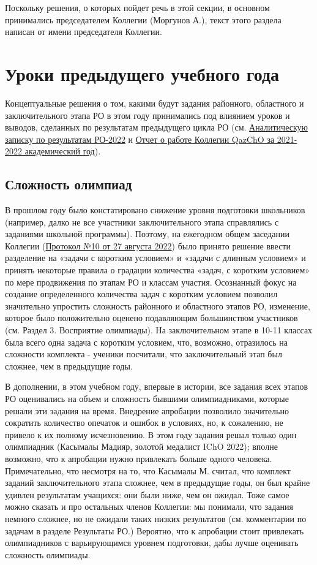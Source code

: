 Поскольку решения, о которых пойдет речь в этой секции, в основном принимались председателем Коллегии (Моргунов А.), текст этого раздела написан от имени председателя Коллегии.

\section{Уроки предыдущего учебного года}

Концептуальные решения о том, какими будут задания районного, областного и заключительного этапа РО в этом году принимались под влиянием уроков и выводов, сделанных по результатам предыдущего цикла РО (см. \href{https://qazcho.kz/docs/reports/qazcho_respa_analysis.pdf}{Аналитическую записку по результатам РО-2022} и \href{https://qazcho.kz/docs/reports/2021-2022-report.pdf}{Отчет о работе Коллегии QazChO за 2021-2022 академический год}). 

\subsection{Сложность олимпиад}

В прошлом году было констатировано снижение уровня подготовки школьников (например, далко не все участники заключительного этапа справлялись с заданиями школьной программы). Поэтому, на ежегодном общем заседании Коллегии (\href{https://qazcho.kz/docs/public-protocols/protocol10.pdf}{Протокол №10 от 27 августа 2022}) было принято решение ввести разделение на «задачи с коротким условием» и «задачи с длинным условием» и принять некоторые правила о градации количества «задач, с коротким условием» по мере продвижения по этапам РО и классам участия. Осознанный фокус на создание определенного количества задач с коротким условием позволил значительно упростить сложность районного и областного этапов РО, изменение, которое было положительно оценено подавляющим большинством участников (см. Раздел 3. Восприятие олимпиады). На заключительном этапе в 10-11 классах была всего одна задача с коротким условием, что, возможно, отразилось на сложности комплекта - ученики посчитали, что заключительный этап был сложнее, чем в предыдущие годы. 

В дополнении, в этом учебном году, впервые в истории, все задания всех этапов РО оценивались на объем и сложность бывшими олимпиадниками, которые решали эти задания на время. Внедрение апробации позволило значительно сократить количество опечаток и ошибок в условиях, но, к сожалению, не привело к их полному исчезновению. В этом году задания решал только один олимпиадник (Касымалы Мадияр, золотой медалист IChO 2022); вполне возможно, что к апробации нужно привлекать больше одного человека. Примечательно, что несмотря на то, что Касымалы М. считал, что комплект заданий заключительного этапа сложнее, чем в предыдущие годы, он был крайне удивлен результатам учащихся: они были ниже, чем он ожидал. Тоже самое можно сказать и про остальных членов Коллегии: мы понимали, что задания немного сложнее, но не ожидали таких низких результатов (см. комментарии по задачам в разделе Результаты РО.) Вероятно, что к апробации стоит привлекать олимпиадников с варьирующимся уровнем подготовки, дабы лучше оценивать сложность олимпиады.

